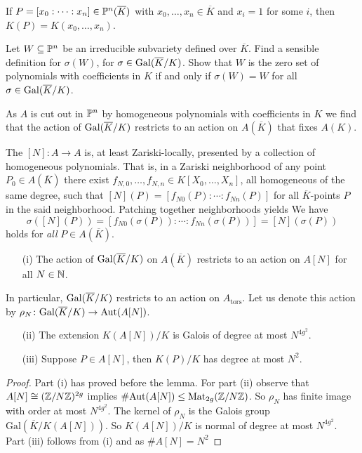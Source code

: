 If $P=[x_0:\cdots:x_n] \in {\mathbb{P}}^n(\overline K)$ with
$x_0,\ldots,x_n\in\overline K$ and $x_i=1$ for some
$i$, then $K(P) = K(x_0,\ldots,x_n)$. 

\begin{exercise}
  Let $W\subseteq{\mathbb{P}}^n$ be an irreducible subvariety defined
  over $\overline K$. Find a sensible definition for $\sigma(W)$,
  for $\sigma\in \mathrm{Gal}(\overline{K}/K)$.  Show that $W$ is the zero set of
  polynomials with coefficients in $K$ if and only if $\sigma(W)=W$
  for all $\sigma\in \mathrm{Gal}(\overline{K}/K)$.
\end{exercise}


As $A$ is cut out in ${\mathbb{P}}^n$ by homogeneous polynomials with
coefficients in $K$ we find that the action of $\mathrm{Gal}(\overline{K}/K)$ restricts to
an action on
$A(\overline K)$ that fixes $A(K)$.

The $[N]\colon A\rightarrow A$ is, at least Zariski-locally, presented
by a collection of homogeneous polynomials. That is, in a Zariski
neighborhood of any point $P_0\in A(\overline K)$ there exist
$f_{N,0},\ldots,f_{N,n}\in K[X_0,\ldots,X_n]$, all homogeneous of the
same degree, such that 
$[N](P) = [f_{N0}(P):\cdots:f_{Nn}(P)]$ for all $\overline K$-points  $P$ in the said
neighborhood.
Patching together neighborhoods yields
We have
$$\sigma([N](P)) = [f_{N0}(\sigma(P)):\cdots:f_{Nn}(\sigma(P))] =
[N](\sigma(P))$$
holds for \textit{all} $P\in A(\overline K)$.


\begin{lemma}\label{lem:galoisactionav}\leavevmode
  \begin{enumerate}
  \item [(i)]
    The
    action of $\mathrm{Gal}(\overline{K}/K)$ on $A(\overline K)$ restricts to an action on
    $A[N]$ for all $N\in{\mathbb{N}}$.
  \end{enumerate}
  In particular, $\mathrm{Gal}(\overline{K}/K)$ restricts to
  an action on $A_{\mathrm{tors}}$. 
  Let us denote this action by
  $\rho_N\colon \mathrm{Gal}(\overline{K}/K)\rightarrow \mathrm{Aut}(A[N])$.
  \begin{enumerate}
  \item[(ii)]
    The extension $K(A[N])/K$ is Galois
    of degree at most $N^{4g^2}$.
  \item[(iii)] Suppose $P\in A[N]$, then $K(P)/K$ has degree at most
    $N^2$. 
  \end{enumerate}
\end{lemma}
\begin{proof}
  Part (i) has proved before the lemma.  For part (ii) observe that
  $A[N]\cong
  ({\mathbb{Z}}/N{\mathbb{Z}})^{2g}$ implies
  $\#\mathrm{Aut}(A[N])\le \mathrm{Mat}_{2g}({{\mathbb{Z}}/N{\mathbb{Z}}})$.
  So  $\rho_N$ has finite image with order at most $N^{4g^2}$. The kernel
  of $\rho_N$ is the Galois group $\mathrm{Gal}(\overline K/K(A[N]))$.
  So $K(A[N])/K$ is normal of degree at most $N^{4g^2}$.
  Part (iii) follows from (i) and as $\#A[N]=N^2$  
\end{proof}

